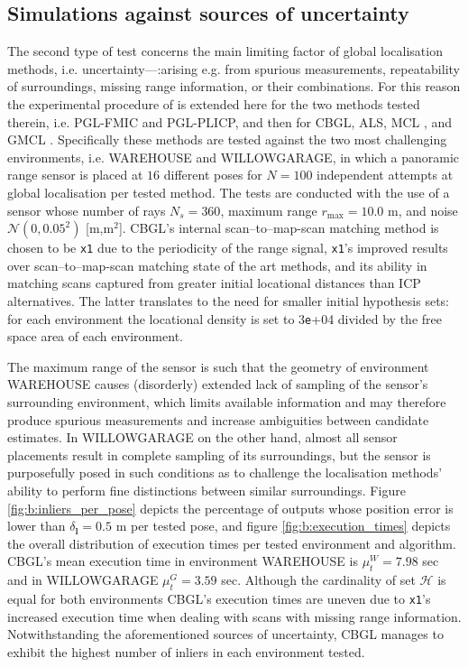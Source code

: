 \subsection{Simulations against sources of uncertainty}
\label{subsec:exp_b}

The second type of test concerns the main limiting factor of global
localisation methods, i.e. uncertainty---:arising e.g. from spurious
measurements, repeatability of surroundings, missing range information, or
their combinations. For this reason the experimental procedure of
\cite{Filotheou2022g} is extended here for the two methods tested therein,
i.e. PGL-FMIC and PGL-PLICP, and then for CBGL, ALS, MCL \cite{mcl}, and GMCL
\cite{gmcl}.  Specifically these methods are tested against the two most
challenging environments, i.e. WAREHOUSE and WILLOWGARAGE, in which a panoramic
range sensor is placed at $16$ different poses for $N = 100$ independent
attempts at global localisation per tested method. The tests are conducted with
the use of a sensor whose number of rays $N_s = 360$, maximum range
$r_{\max} = 10.0$ m, and noise $\mathcal{N}(0, 0.05^2)$ [m,m$^2$]. CBGL's
internal scan--to--map-scan matching method is chosen to be \texttt{x1}
\cite{Filotheou2023a} due to the periodicity of the range signal,
\texttt{x1}'s improved results over scan--to--map-scan matching state of the
art methods, and its ability in matching scans captured from greater initial
locational distances than ICP alternatives. The latter translates to the need
for smaller initial hypothesis sets: for each environment the locational
density is set to $3$\texttt{e}+04 divided by the free space area
of each environment.

The maximum range of the sensor is such that the geometry of environment
WAREHOUSE causes (disorderly) extended lack of sampling of the sensor's
surrounding environment, which limits available information and may therefore
produce spurious measurements and increase ambiguities between candidate
estimates. In WILLOWGARAGE on the other hand, almost all sensor placements
result in complete sampling of its surroundings, but the sensor is purposefully
posed in such conditions as to challenge the localisation methods' ability to
perform fine distinctions between similar surroundings. Figure
\ref{fig:b:inliers_per_pose} depicts the percentage of outputs whose position
error is lower than $\delta_{\bm{l}} = 0.5$ m per tested pose, and figure
\ref{fig:b:execution_times} depicts the overall distribution of execution times
per tested environment and algorithm. CBGL's mean execution time in environment
WAREHOUSE is $\mu_t^W = 7.98$ sec and in WILLOWGARAGE $\mu_t^{G} = 3.59$ sec.
Although the cardinality of set $\mathcal{H}$ is equal for both environments
CBGL's execution times are uneven due to \texttt{x1}'s increased execution
time when dealing with scans with missing range information. Notwithstanding
the aforementioned sources of uncertainty, CBGL manages to exhibit the highest
number of inliers in each environment tested.


